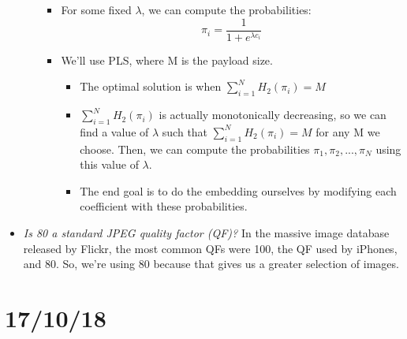 \documentclass[11pt,a4paper]{report}
\begin{document}
\begin{itemize}
\begin{enumerate}
\begin{itemize}
    \item For some fixed $\lambda$, we can compute the probabilities:
      \begin{equation*}
      \pi_i = \frac{1}{1+e^{\lambda c_i}}
      \end{equation*}

    \item We'll use PLS, where M is the payload size.
      \begin{itemize}
      \item The optimal solution is when $\sum\limits_{i=1}^N H_2(\pi_i) = M$
      \item $\sum\limits_{i=1}^N H_2(\pi_i)$ is actually monotonically decreasing, so we can find a value of $\lambda$ such that $\sum\limits_{i=1}^N H_2(\pi_i) = M$ for any M we choose. Then, we can compute the probabilities $\pi_1, \pi_2, ..., \pi_N$ using this value of $\lambda$.
      \item The end goal is to do the embedding ourselves by modifying each coefficient with these probabilities.
      \end{itemize}
    \end{itemize}

  \end{enumerate}

\item \textit{Is 80 a standard JPEG quality factor (QF)?} In the massive image database released by Flickr, the most common QFs were 100, the QF used by iPhones, and 80. So, we're using 80 because that gives us a greater selection of images.

\end{itemize}


\section{17/10/18}
\end{document}
